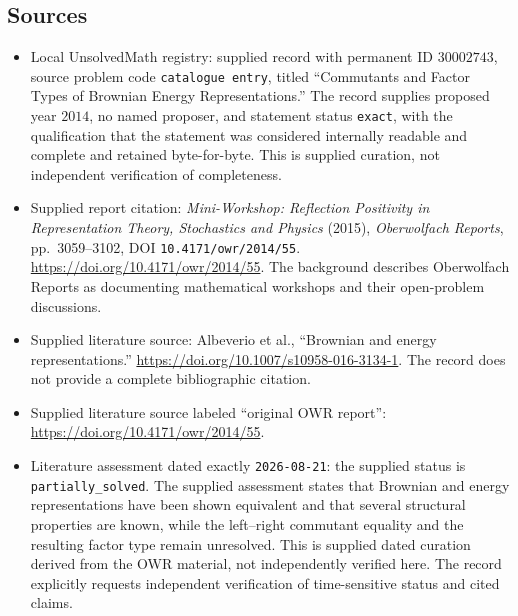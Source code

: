 \documentclass[11pt]{article}
\begin{document}
\subsection{Sources}
\begin{itemize}
\item Local UnsolvedMath registry: supplied record with permanent ID \(30002743\), source problem code \texttt{catalogue entry}, titled ``Commutants and Factor Types of Brownian Energy Representations.'' The record supplies proposed year \(2014\), no named proposer, and statement status \texttt{exact}, with the qualification that the statement was considered internally readable and complete and retained byte-for-byte. This is supplied curation, not independent verification of completeness.
\item Supplied report citation: \emph{Mini-Workshop: Reflection Positivity in Representation Theory, Stochastics and Physics} (2015), \emph{Oberwolfach Reports}, pp.\ 3059--3102, DOI \texttt{10.4171/owr/2014/55}. \url{https://doi.org/10.4171/owr/2014/55}. The background describes Oberwolfach Reports as documenting mathematical workshops and their open-problem discussions.
\item Supplied literature source: Albeverio et al., ``Brownian and energy representations.'' \url{https://doi.org/10.1007/s10958-016-3134-1}. The record does not provide a complete bibliographic citation.
\item Supplied literature source labeled ``original OWR report'': \url{https://doi.org/10.4171/owr/2014/55}.
\item Literature assessment dated exactly \texttt{2026-08-21}: the supplied status is \texttt{partially\_solved}. The supplied assessment states that Brownian and energy representations have been shown equivalent and that several structural properties are known, while the left--right commutant equality and the resulting factor type remain unresolved. This is supplied dated curation derived from the OWR material, not independently verified here. The record explicitly requests independent verification of time-sensitive status and cited claims.
\end{itemize}
\end{document}

